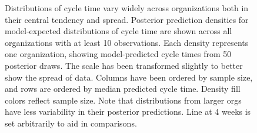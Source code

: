 \documentclass[
  sn-mathphys-ay,
]{sn-jnl}
\begin{document}
\begin{figure}


\caption[Distributions of cycle time vary widely across organizations
both in their central tendency and
spread]{\label{fig-pp-check-org}Distributions of cycle time vary widely
across organizations both in their central tendency and spread.
Posterior prediction densities for model-expected distributions of cycle
time are shown across all organizations with at least 10 observations.
Each density represents one organization, showing model-predicted cycle
times from 50 posterior draws. The scale has been transformed slightly
to better show the spread of data. Columns have been ordered by sample
size, and rows are ordered by median predicted cycle time. Density fill
colors reflect sample size. Note that distributions from larger orgs
have less variability in their posterior predictions. Line at 4 weeks is
set arbitrarily to aid in comparisons.}

\end{figure}%
\end{document}
